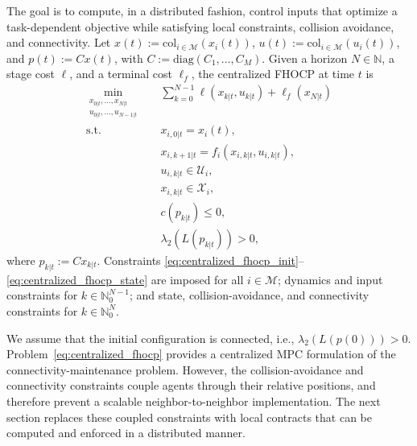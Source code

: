 \documentclass[letterpaper, 10 pt, conference]{ieeeconf}  %
\begin{document}
The goal is to compute, in a distributed fashion, control inputs that optimize a
task-dependent objective while satisfying local constraints, collision
avoidance, and connectivity. Let $x(t):=\mathrm{col}_{i\in\mathcal{M}}(x_i(t))$,
$u(t):=\mathrm{col}_{i\in\mathcal{M}}(u_i(t))$, and
$p(t):=Cx(t)$, with $C:=\mathrm{diag}(C_1,\ldots,C_M)$. Given a horizon
$N\in\mathbb{N}$, a stage cost $\ell$, and a terminal cost $\ell_f$, the
centralized FHOCP at time $t$ is
\begin{subequations}\label{eq:centralized_fhocp}
	\begin{align}
		\min_{\substack{x_{0|t},\dots,x_{N|t}                                  \\
		u_{0|t},\dots,u_{N-1|t}}}\quad &
		\sum_{k=0}^{N-1}\ell(x_{k|t},u_{k|t})+\ell_f(x_{N|t})
		\label{eq:centralized_fhocp_cost}
		\\
		\mathrm{s.t.}\quad
		                               & x_{i,0|t}=x_i(t),
		\label{eq:centralized_fhocp_init}
		\\
		                               & x_{i,k+1|t}=f_i(x_{i,k|t},u_{i,k|t}),
		\label{eq:centralized_fhocp_dyn}
		\\
		                               & u_{i,k|t}\in\mathcal{U}_i,
		\label{eq:centralized_fhocp_input}
		\\
		                               & x_{i,k|t}\in\mathcal{X}_i,
		\label{eq:centralized_fhocp_state}
		\\
		                               & c(p_{k|t})\leq 0,
		\label{eq:centralized_fhocp_collision}
		\\
		                               & \lambda_2(L(p_{k|t}))>0,
		\label{eq:centralized_fhocp_connectivity}
	\end{align}
\end{subequations}
where $p_{k|t}:=Cx_{k|t}$. Constraints
\eqref{eq:centralized_fhocp_init}--\eqref{eq:centralized_fhocp_state} are
imposed for all $i\in\mathcal{M}$; dynamics and input constraints for
$k\in\mathbb{N}_0^{N-1}$; and state, collision-avoidance, and connectivity
constraints for $k\in\mathbb{N}_0^{N}$.

We assume that the initial configuration is connected, i.e.,
$\lambda_2(L(p(0)))>0$. Problem~\eqref{eq:centralized_fhocp} provides a
centralized MPC formulation of the connectivity-maintenance problem. However,
the collision-avoidance and connectivity constraints couple agents through
their relative positions, and therefore prevent a scalable neighbor-to-neighbor
implementation. The next section replaces these coupled constraints with local
contracts that can be computed and enforced in a distributed manner.
\end{document}
